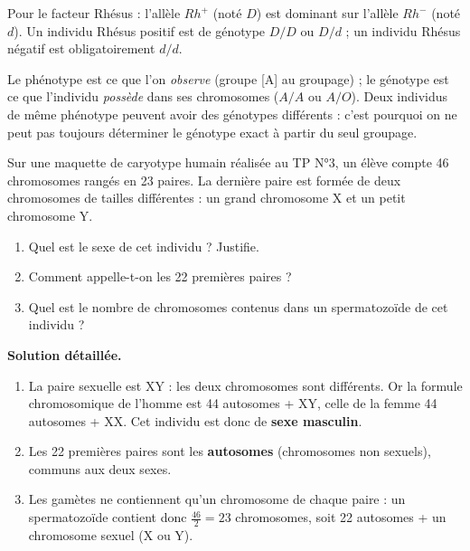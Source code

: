 \documentclass[11pt]{article}
\newcounter{popsec}
\newcounter{popsub}
\newcommand{\courssub}[1]{%
  \stepcounter{popsub}%
  \par\vspace{9pt}\noindent{\popxbold\fontsize{11.5}{13}\selectfont\color{popink}{\color{poporange}\thepopsec.\thepopsub}\hspace{6pt}#1}\par\nopagebreak\vspace{4pt}
}
\begin{document}
Pour le facteur Rhésus : l'allèle $Rh^+$ (noté $D$) est dominant sur l'allèle $Rh^-$ (noté $d$). Un individu Rhésus positif est de génotype $D/D$ ou $D/d$ ; un individu Rhésus négatif est obligatoirement $d/d$.

\begin{attention}
Le phénotype est ce que l'on \emph{observe} (groupe [A] au groupage) ; le génotype est ce que l'individu \emph{possède} dans ses chromosomes ($A/A$ ou $A/O$). Deux individus de même phénotype peuvent avoir des génotypes différents : c'est pourquoi on ne peut pas toujours déterminer le génotype exact à partir du seul groupage.
\end{attention}

\courssub{Exercices de synthèse}

\begin{exoresolu}
Sur une maquette de caryotype humain réalisée au TP N°3, un élève compte 46 chromosomes rangés en 23 paires. La dernière paire est formée de deux chromosomes de tailles différentes : un grand chromosome X et un petit chromosome Y.
\begin{enumerate}
\item Quel est le sexe de cet individu ? Justifie.
\item Comment appelle-t-on les 22 premières paires ?
\item Quel est le nombre de chromosomes contenus dans un spermatozoïde de cet individu ?
\end{enumerate}
\tcblower
\textbf{Solution détaillée.}
\begin{enumerate}
\item La paire sexuelle est XY : les deux chromosomes sont différents. Or la formule chromosomique de l'homme est 44 autosomes + XY, celle de la femme 44 autosomes + XX. Cet individu est donc de \textbf{sexe masculin}.
\item Les 22 premières paires sont les \textbf{autosomes} (chromosomes non sexuels), communs aux deux sexes.
\item Les gamètes ne contiennent qu'un chromosome de chaque paire : un spermatozoïde contient donc $\frac{46}{2} = 23$ chromosomes, soit 22 autosomes + un chromosome sexuel (X ou Y).
\end{enumerate}
\end{exoresolu}
\end{document}
